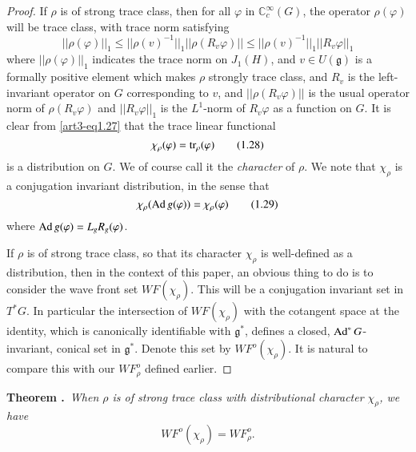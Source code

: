 \begin{proof}
If $\rho$ is of strong trace class, then for all $\varphi$ in $\mathbb{C}^{\infty}_{c}(G)$, the operator $\rho(\varphi)$  will be trace class, with trace norm satisfying
\begin{equation*}
||\rho(\varphi)||_{1}\leq ||\rho(v)^{-1}||_{1}||\rho(R_{v}\varphi)||\leq ||\rho(v)^{-1}||_{1}||R_{v}\varphi||_{1}\tag{1.27}\label{art3-eq1.27}
\end{equation*}
where $||\rho(\varphi)||_{1}$ indicates the trace norm on $J_{1}(H)$, and $v\in U(\mathfrak{g})$ is a formally positive element which makes $\rho$ strongly trace class, and $R_{v}$ is the left-invariant operator on $G$ corresponding to $v$, and $||\rho(R_{v}\varphi)||$ is the usual operator norm of $\rho(R_{v}\varphi)$ and $||R_{v}\varphi||_{1}$ is the $L^{1}$-norm of $R_{v}\varphi$ as a function on $G$. It is clear from \eqref{art3-eq1.27} that the trace linear functional 
\begin{equation*}
\chi_{\rho}(\varphi)=\operatorname{tr}_{\rho}(\varphi)\tag{1.28}\label{art3-eq1.28}
\end{equation*}\pageoriginale
is a distribution on $G$. We of course call it the {\em character} of $\rho$. We note that $\chi_{\rho}$ is a conjugation invariant distribution, in the sense that
\begin{equation*}
\chi_{\rho}(\operatorname{Ad} g(\varphi))=\chi_{\rho}(\varphi)\tag{1.29}\label{art3-eq1.29}
\end{equation*}
where $\operatorname{Ad} g(\varphi)=L_{g}R_{g}(\varphi)$.

If $\rho$ is of strong trace class, so that its character $\chi_{\rho}$ is well-defined as a distribution, then in the context of this paper, an obvious thing to do is to consider the wave front set $WF(\chi_{\rho})$. This will be a conjugation invariant set in $T^{*}G$. In particular the intersection of $WF(\chi_{\rho})$ with the cotangent space at the identity, which is canonically identifiable with $\mathfrak{g}^{*}$, defines a closed, $\operatorname{Ad}^{*}G$-invariant, conical set in $\mathfrak{g}^{*}$. Denote this set by $WF^{o}(\chi_{\rho})$. It is natural to compare this with our $WF^{o}_{\rho}$ defined earlier.
\end{proof}

\medskip
\noindent
{\bf Theorem .\label{art3-thm1.8}}~{\em When $\rho$ is of strong trace class with distributional character $\chi_{\rho}$, we have}
\begin{equation*}
WF^{o}(\chi_{\rho})=WF^{o}_{\rho}.\tag{1.30}\label{art3-eq1.30}
\end{equation*}

